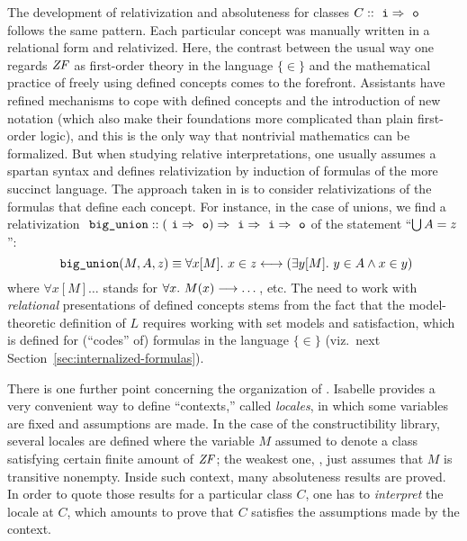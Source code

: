 The development of relativization and absoluteness for classes $C::
\isatt{i} \fun \isatt{o}$ follows the same pattern. Each particular
concept was manually written in a relational form and relativized.
Here, the contrast between the usual way one regards $\mathit{ZF}$ as
first-order theory in the language $\{\in \}$ and the mathematical
practice of freely using defined concepts comes to the
forefront. Assistants have refined mechanisms to cope with defined
concepts and the introduction of new notation (which also make their foundations more complicated
than plain first-order logic), and this is the only way that nontrivial
mathematics can be formalized. But when studying relative interpretations, one
usually assumes a spartan syntax and defines relativization by
induction of formulas of the more succinct language. The approach
taken in  is to consider relativizations of
the formulas that define each concept. For instance,
in the case of unions, we find a relativization
$\isatt{big{\uscore}union}:: (\isatt{i} \fun \isatt{o}) \fun \isatt{i}
\fun \isatt{i} \fun \isatt{o}$ of the statement
“$\mathop{\textstyle\bigcup} A = z$”:
\[
 \isatt{big{\uscore}union}(M,A,z) \equiv \forall x[M].\ x \in z
 \longleftrightarrow (\exists y[M].\ y \in A \land x \in y)
\]
where $\forall x[M]\dots$ stands for $\forall x.\ M(x)\longrightarrow \dots$,
etc. The need to work with \emph{relational} presentations of defined
concepts stems from the fact that the model-theoretic definition of
$L$ requires working with set models and satisfaction, which is
defined for (“codes” of) formulas in the language $\{\in \}$
(viz.\ next Section~\ref{sec:internalized-formulas}).

There is one further point concerning the organization of
. Isabelle provides a very convenient way to
define “contexts,” called \emph{locales}, in which some variables are
fixed and assumptions are made. In the case of the constructibility
library, several locales are defined where the variable $M$ assumed to
denote a class satisfying certain finite amount of $\mathit{ZF}$; the weakest
one,  \cite[Sect.~3]{2020arXiv200109715G}, just
assumes that $M$ is transitive nonempty. Inside such context, many
absoluteness results are proved. In order to quote those results for a
particular class $C$, one has to \emph{interpret} the locale at
$C$, which amounts to prove that $C$ satisfies the assumptions made by
the context.

